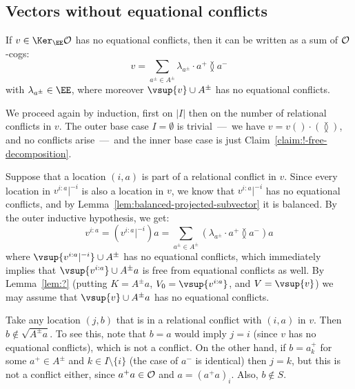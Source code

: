 \subsection{Vectors without equational conflicts}\label{subsec:unambiguous}
\begin{claim}\label{claim:?-free-decomposition}
     If $v \in \Ker_\EE \cal O$ has no equational conflicts, then it can be written as a sum of $\cal O$-cogs:
    \[
        v = \sum_{a^\pm \in A^\pm} \lambda_{a^\pm} \cdot a^+ \between a^-
    \]
    with $\lambda_{a^\pm} \in \EE$, where moreover $\vsup{v} \cup A^\pm$ has no equational conflicts.
\end{claim}
\begin{claimproof}
We proceed again by induction, first on $|I|$ then on the number of relational conflicts in $v$.
The outer base case $I = \emptyset$ is trivial~---~we have $v = v() \cdot ( \between )$, and no conflicts arise~---~and the inner base case is just Claim~\ref{claim:!-free-decomposition}.

Suppose that a location $(i, a)$ is part of a relational conflict in $v$.
Since every location in $v^{i:a}|^{-i}$ is also a location in $v$, we know that $v^{i:a}|^{-i}$ has no equational conflicts, and by Lemma~\ref{lem:balanced-projected-subvector} it is balanced.
By the outer inductive hypothesis, we get:
\[
    v^{i:a} = (v^{i:a}|^{-i}) a = \sum_{a^\pm\in A^\pm} (\lambda_{a^\pm} \cdot a^+ \between a^-) a
\]
where $\vsup{v^{i:a}|^{-i}}\cup A^\pm$ has no equational conflicts, 
which immediately implies that $\vsup{v^{i:a}}\cup A^\pm a$ is free from equational conflicts as well. 
By Lemma~\ref{lem:?} (putting $K=A^\pm a$, $V_0=\vsup{v^{i:a}}$, and $V=\vsup{v}$) 
we may assume that $\vsup{v}\cup A^\pm a$ has no equational conflicts.

Take any location $(j,b)$ that is in a relational conflict with $(i,a)$ in $v$. 
Then $b\not\in\sqrt{A^\pm a}$. 
To see this, note that $b=a$ would imply $j=i$ (since $v$ has no equational conflicts), which is not a conflict. 
On the other hand, if $b = a^+_k$ for some $a^+ \in A^\pm$ and $k \in I \setminus \{i\}$ (the case of $a^-$ is identical) 
then $j=k$, but this is not a conflict either, since $a^+a\in\cal O$ and $a=(a^+a)_i$.
Also, $b \not\in S$.


\end{claimproof}
